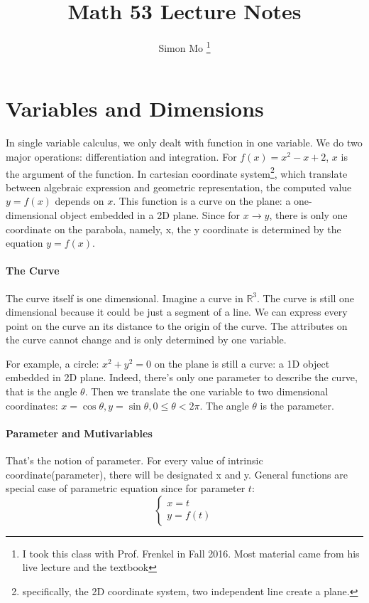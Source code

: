 \documentclass[11pt, oneside]{article}   	%
\title{Math 53 Lecture Notes}
\author{Simon Mo \footnote{I took this class with Prof. Frenkel in Fall 2016. Most material came from his live lecture and the textbook}}
\date{}
\begin{document}
\maketitle



\section{Variables and Dimensions}
In single variable calculus, we only dealt with function in one variable. We do two major operations: differentiation and integration. For $f(x)=x^2-x+2$, $x$ is the argument of the function. In cartesian coordinate system\footnote{specifically, the 2D coordinate system, two independent line create a plane.}, which translate between algebraic expression and geometric representation, the computed value $y=f(x)$ depends on $x$. This function is a curve on the plane: a one-dimensional object embedded in a 2D plane. Since for $x \to y$, there is only one coordinate on the parabola, namely, x, the y coordinate is determined by the equation $y=f(x)$. 
\paragraph{The Curve}
The curve itself is one dimensional. Imagine a curve in $\mathbb{R}^3$. The curve is still one dimensional because it could be just a segment of a line. We can express every point on the curve an its distance to the origin of the curve. The attributes on the curve cannot change and is only determined by one variable. 

For example, a circle: $x^2+y^2=0$ on the plane is still a curve: a 1D object embedded in 2D plane. Indeed, there's only one parameter to describe the curve, that is the angle $\theta$. Then we translate the one variable to two dimensional coordinates: $x = \cos{\theta}, y = \sin{\theta}, 0\le \theta < 2\pi$. The angle $\theta$ is the parameter. 
\paragraph{Parameter and Mutivariables}
That's the notion of parameter. For every value of intrinsic coordinate(parameter), there will be designated x and y. General functions are special case of parametric equation since for parameter $t$: 
\begin{equation}
  \begin{cases}
    x = t\\
    y = f(t)
  \end{cases}
\end{equation}
\end{document}
